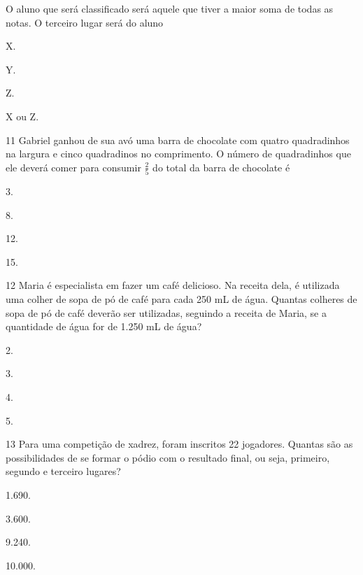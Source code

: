 O aluno que será classificado será aquele que tiver a maior
soma de todas as notas. O terceiro lugar será do aluno

\begin{multicols}{2}
\begin{escolha}
\item
  X.
\item
  Y.
\item
  Z.
\item
  X ou Z.
\end{escolha}
\end{multicols}

\num{11} Gabriel ganhou de sua avó uma barra de chocolate com quatro quadradinhos na largura e cinco quadradinos no comprimento.
O número de quadradinhos que ele deverá comer para consumir $\frac{2}{5}$ do total
da barra de chocolate é

\begin{multicols}{2}
\begin{escolha}
\item
  3.
\item
  8.
\item
  12.
\item
  15.
\end{escolha}
\end{multicols}

\num{12} Maria é especialista em fazer um café delicioso. Na receita dela, é utilizada uma colher de sopa de pó de café para cada 250 mL
de água. Quantas colheres de sopa de pó de café deverão ser utilizadas, seguindo a receita de Maria, se a quantidade de água for de 1.250 mL de água?

\begin{multicols}{2}
\begin{escolha}
\item
  2.
\item
  3.
\item
  4.
\item
  5.
\end{escolha}
\end{multicols}


\num{13} Para uma competição de xadrez, foram inscritos 22 jogadores. Quantas são
as possibilidades de se formar o pódio com o resultado final, ou seja,
primeiro, segundo e terceiro lugares?

\begin{multicols}{2}
\begin{escolha}
\item
  1.690.
\item
  3.600.
\item
  9.240.
\item
  10.000.
\end{escolha}
\end{multicols}

